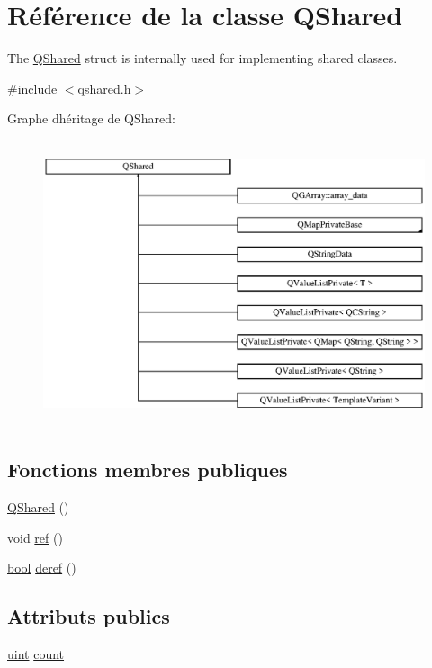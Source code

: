 \hypertarget{struct_q_shared}{}\section{Référence de la classe Q\+Shared}
\label{struct_q_shared}


The \hyperlink{struct_q_shared}{Q\+Shared} struct is internally used for implementing shared classes.  




{\ttfamily \#include $<$qshared.\+h$>$}

Graphe d\textquotesingle{}héritage de Q\+Shared\+:\begin{figure}[H]
\begin{center}
\leavevmode
\includegraphics[height=8.400000cm]{struct_q_shared}
\end{center}
\end{figure}
\subsection*{Fonctions membres publiques}
\begin{DoxyCompactItemize}
\item 
\hyperlink{struct_q_shared_ab02a4e2624298f31666940c03f37dfa8}{Q\+Shared} ()
\item 
void \hyperlink{struct_q_shared_a20671806e1295621109b5f45b03432e9}{ref} ()
\item 
\hyperlink{qglobal_8h_a1062901a7428fdd9c7f180f5e01ea056}{bool} \hyperlink{struct_q_shared_aa2f1346500c450dff27c4e6ac27da337}{deref} ()
\end{DoxyCompactItemize}
\subsection*{Attributs publics}
\begin{DoxyCompactItemize}
\item 
\hyperlink{qglobal_8h_a4d3943ddea65db7163a58e6c7e8df95a}{uint} \hyperlink{struct_q_shared_a9961bb28bf070de1bf62deb83533411d}{count}
\end{DoxyCompactItemize}


